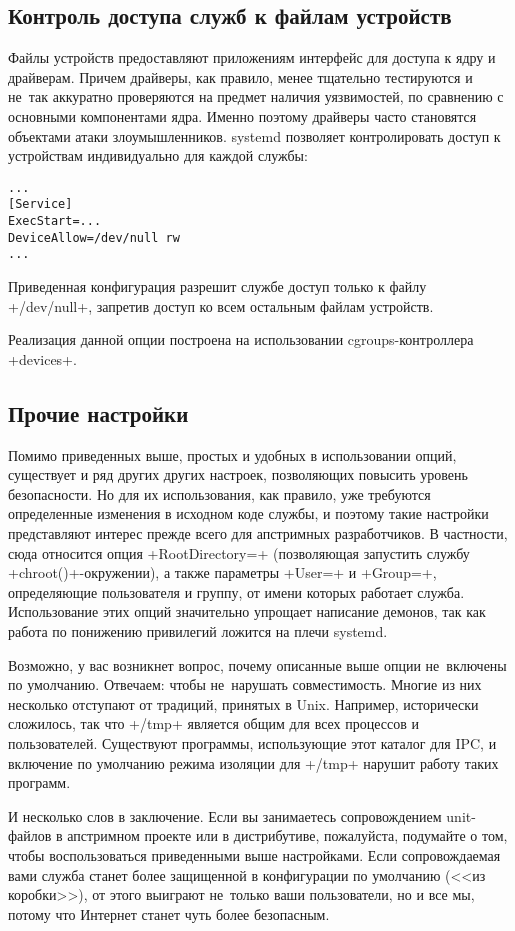 \documentclass[10pt,oneside,a4paper]{article}
\begin{document}
\subsection{Контроль доступа служб к файлам устройств}

Файлы устройств предоставляют приложениям интерфейс для доступа к ядру и
драйверам. Причем драйверы, как правило, менее тщательно тестируются и не~так
аккуратно проверяются на предмет наличия уязвимостей, по сравнению с основными
компонентами ядра. Именно поэтому драйверы часто становятся объектами атаки
злоумышленников. systemd позволяет контролировать доступ к устройствам
индивидуально для каждой службы:
\begin{Verbatim}
...
[Service]
ExecStart=...
DeviceAllow=/dev/null rw
...
\end{Verbatim}
Приведенная конфигурация разрешит службе доступ только к файлу +/dev/null+,
запретив доступ ко всем остальным файлам устройств.

Реализация данной опции построена на использовании cgroups-контроллера
+devices+.

\subsection{Прочие настройки}

Помимо приведенных выше, простых и удобных в использовании опций, существует и
ряд других других настроек, позволяющих повысить уровень безопасности. Но
для их использования, как правило, уже требуются определенные изменения в
исходном коде службы, и поэтому такие настройки представляют интерес прежде
всего для апстримных разработчиков. В частности, сюда относится опция
+RootDirectory=+ (позволяющая запустить службу +chroot()+-окружении), а также
параметры +User=+ и +Group=+, определяющие пользователя и группу, от имени
которых работает служба.  Использование этих опций значительно упрощает
написание демонов, так как работа по понижению привилегий ложится на плечи
systemd.

Возможно, у вас возникнет вопрос, почему описанные выше опции не~включены по
умолчанию.  Отвечаем: чтобы не~нарушать совместимость. Многие из них несколько
отступают от традиций, принятых в Unix. Например, исторически сложилось, так что
+/tmp+ является общим для всех процессов и пользователей. Существуют программы,
использующие этот каталог для IPC, и включение по умолчанию режима изоляции для
+/tmp+ нарушит работу таких программ.

И несколько слов в заключение. Если вы занимаетесь сопровождением unit-файлов
в апстримном проекте или в дистрибутиве, пожалуйста, подумайте о том, чтобы
воспользоваться приведенными выше настройками. Если сопровождаемая вами служба
станет более защищенной в конфигурации по умолчанию (<<из коробки>>), от этого
выиграют не~только ваши пользователи, но и все мы, потому что Интернет станет
чуть более безопасным.
\end{document}
